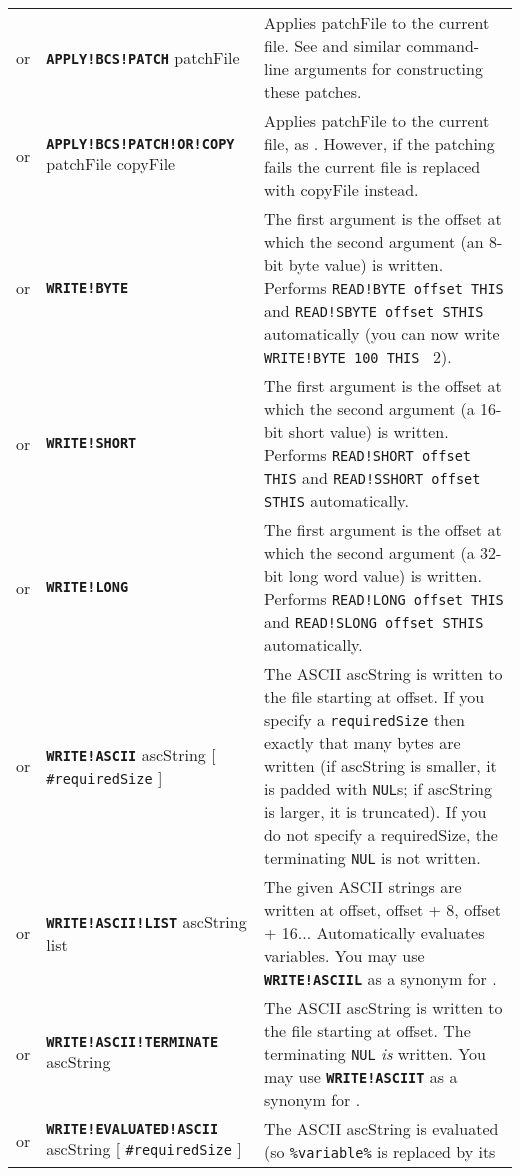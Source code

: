 \documentclass{article}
\def\ttref#1{\ahrefloc{#1}{\tt #1}}
\def\DEFINE#1{{\tt \bf #1}\label{#1}\index{#1}}
\def\t#1{{\tt #1}}
\def\Slist{{\color{red} list }}
\def\Ob{{\color{red} [ }}
\def\Oe{{\color{red} ] }}
\begin{document}
\begin{tabular}{cp{10in}|p{10in}}
or & \DEFINE{APPLY!BCS!PATCH} patchFile &
  Applies patchFile to the current file. See \ttref{--bcmp-from} and similar
  command-line arguments for constructing these patches. \\
or & \DEFINE{APPLY!BCS!PATCH!OR!COPY} patchFile copyFile &
  Applies patchFile to the current file, as \ttref{APPLY!BCS!PATCH}.
  However, if the patching fails the current file is replaced with copyFile
  instead. \\
or & \DEFINE{WRITE!BYTE} \ttref{offset} \ttref{value} &
  The first argument is the offset at which the second argument (an 8-bit
  byte value) is written. Performs \verb+READ!BYTE offset THIS+ and
  \verb+READ!SBYTE offset STHIS+ automatically (you can now write
  \verb+WRITE!BYTE 100 THIS + 2).  \\
or & \DEFINE{WRITE!SHORT} \ttref{offset} \ttref{value} &
  The first argument is the offset at which the second argument (a 16-bit
  short value) is written. Performs \verb+READ!SHORT offset THIS+ and
  \verb+READ!SSHORT offset STHIS+ automatically. \\
or & \DEFINE{WRITE!LONG} \ttref{offset} \ttref{value} &
  The first argument is the offset at which the second argument (a 32-bit
  long word value) is written. Performs \verb+READ!LONG offset THIS+ and
  \verb+READ!SLONG offset STHIS+ automatically. \\
or & \DEFINE{WRITE!ASCII} \ttref{offset} ascString
    \Ob \t{\#requiredSize} \Oe &
  The ASCII ascString is written to the file starting at offset.
  If you specify a \t{requiredSize} then exactly that many bytes are
  written (if ascString is smaller, it is padded with \t{NUL}s; if
  ascString is larger, it is truncated). If you do not specify a requiredSize,
  the terminating \t{NUL} is not written. \\
or & \DEFINE{WRITE!ASCII!LIST} \ttref{offset} ascString \Slist &
  The given ASCII strings are written at offset, offset + 8, offset + 16...
  Automatically evaluates variables. You may use \DEFINE{WRITE!ASCIIL}
  as a synonym for \ttref{WRITE!ASCII!LIST}.\\
or & \DEFINE{WRITE!ASCII!TERMINATE} \ttref{offset} ascString &
  The ASCII ascString is written to the file starting at offset.
  The terminating \t{NUL} \emph{is} written. You may use
  \DEFINE{WRITE!ASCIIT} as a synonym for \ttref{WRITE!ASCII!TERMINATE}. \\
or & \DEFINE{WRITE!EVALUATED!ASCII} \ttref{offset} ascString
    \Ob \t{\#requiredSize} \Oe &
  The ASCII ascString is evaluated (so \t{\%variable\%} is replaced by its

\end{tabular}
\end{document}
